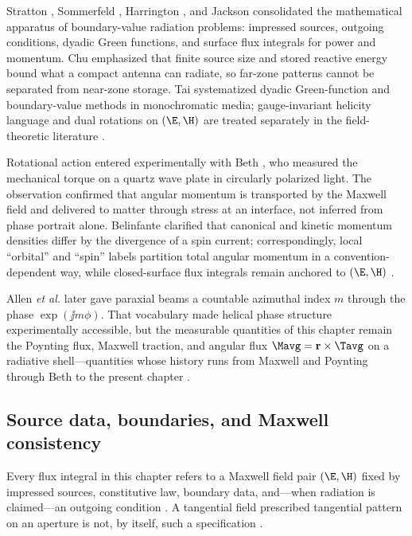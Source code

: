 Stratton \cite{stratton1941}, Sommerfeld \cite{sommerfeld1949}, Harrington
\cite{harrington2001}, and Jackson \cite{jackson1999} consolidated the mathematical
apparatus of boundary-value radiation problems: impressed sources, outgoing conditions,
dyadic Green functions, and surface flux integrals for power and momentum. Chu
\cite{chu1948} emphasized that finite source size and stored reactive energy bound what
a compact antenna can radiate, so far-zone patterns cannot be separated from near-zone
storage. Tai \cite{tai1994} systematized dyadic Green-function and boundary-value methods in monochromatic media; gauge-invariant helicity language and dual rotations on $(\E,\H)$ are treated separately in the field-theoretic literature \cite{belinfante1940,tai1994}.

Rotational action entered experimentally with Beth \cite{beth1936}, who measured the
mechanical torque on a quartz wave plate in circularly polarized light. The observation
confirmed that angular momentum is transported by the Maxwell field and delivered to
matter through stress at an interface, not inferred from phase portrait alone. Belinfante
\cite{belinfante1940} clarified that canonical and kinetic momentum densities differ by
the divergence of a spin current; correspondingly, local ``orbital'' and ``spin''
labels partition total angular momentum in a convention-dependent way, while closed-surface
flux integrals remain anchored to $(\E,\H)$ \cite{belinfante1940,stratton1941}.

Allen \emph{et al.} \cite{allen1992} later gave paraxial beams a countable azimuthal
index $m$ through the phase $\exp(\jj m\phi)$. That vocabulary made helical phase
structure experimentally accessible, but the measurable quantities of this chapter remain
the Poynting flux, Maxwell traction, and angular flux $\Mavg=\mathbf{r}\times\Tavg$
on a radiative shell---quantities whose history runs from Maxwell and Poynting through
Beth to the present chapter \cite{poynting1884,beth1936,allen1992}.
\subsection{Source data, boundaries, and Maxwell consistency}
\label{sec:ch01.0.1}

Every flux integral in this chapter refers to a Maxwell field pair $(\E,\H)$ fixed
by impressed sources, constitutive law, boundary data, and---when radiation is
claimed---an outgoing condition \cite{stratton1941,maxwell1873}. A tangential field
prescribed tangential pattern on an aperture is not, by itself, such a specification
\cite{harrington2001}.

